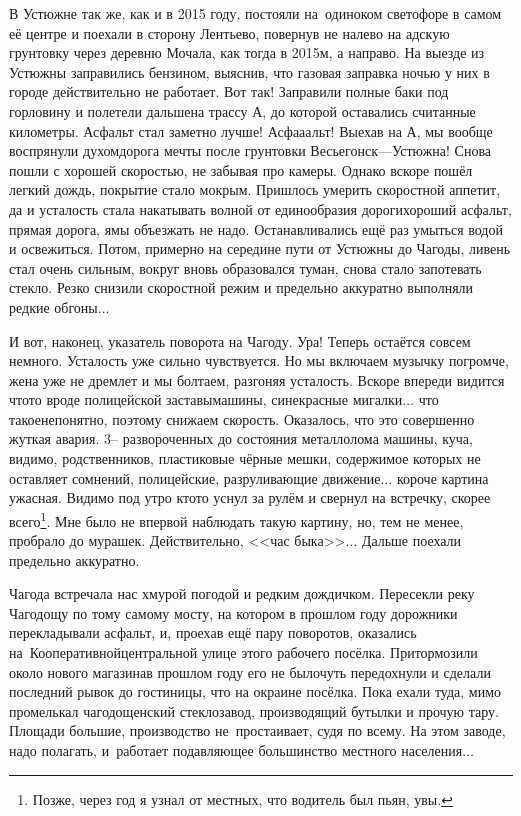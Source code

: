 В Устюжне так же, как и в 2015 году, постояли на~одиноком светофоре в самом её центре и поехали в сторону Лентьево, повернув не налево на адскую грунтовку через деревню Мочала, как тогда в 2015\sdash м, а направо. На выезде из Устюжны заправились бензином, выяснив, что газовая заправка ночью у них в городе действительно не работает. Вот так! Заправили полные баки под горловину и полетели дальше\mdash на трассу А, до которой оставались считанные километры. Асфальт стал заметно лучше! Асфа\sdash а\sdash альт! Выехав на А, мы вообще воспрянули духом\mdash дорога мечты после грунтовки Весьегонск\thinspace\nobreakdash---\thinspace Устюжна! Снова пошли с хорошей скоростью, не забывая про камеры. Однако вскоре пошёл легкий дождь, покрытие стало мокрым. Пришлось умерить скоростной аппетит, да и усталость стала накатывать волной от единообразия дороги\mdash хороший асфальт, прямая дорога, ямы объезжать не надо. Останавливались ещё раз умыться водой и освежиться. Потом, примерно на середине пути от Устюжны до Чагоды, ливень стал очень сильным, вокруг вновь образовался туман, снова стало запотевать стекло. Резко снизили скоростной режим и предельно аккуратно выполняли редкие обгоны$\ldots$

И вот, наконец, указатель поворота на Чагоду. Ура! Теперь остаётся совсем немного. Усталость уже сильно чувствуется. Но мы включаем музычку погромче, жена уже не дремлет и мы болтаем, разгоняя усталость. Вскоре впереди видится что\sdash то вроде полицейской заставы\mdash машины, сине\sdash красные мигалки$\ldots$ что такое\mdash непонятно, поэтому снижаем скорость. Оказалось, что это совершенно жуткая авария. 3\thinspace\nobreakdash-- развороченных до состояния металлолома машины, куча, видимо, родственников, пластиковые чёрные мешки, содержимое которых не оставляет сомнений, полицейские, разруливающие движение$\ldots$ короче картина ужасная. Видимо под утро кто\sdash то уснул за рулём и свернул на встречку, скорее всего\footnote{Позже, через год я узнал от местных, что водитель был пьян, увы.}. Мне было не впервой наблюдать такую картину, но, тем не менее, пробрало до мурашек. Действительно, <<час быка>>$\ldots$ Дальше поехали предельно аккуратно.

Чагода встречала нас хмурой погодой и редким дождичком. Пересекли реку Чагодощу по тому самому мосту, на котором в прошлом году дорожники перекладывали асфальт, и, проехав ещё пару поворотов, оказались на~Кооперативной\mdash центральной улице этого рабочего посёлка. Притормозили около нового магазина\mdash в прошлом году его не было\mdash чуть передохнули и сделали последний рывок до гостиницы, что на окраине посёлка. Пока ехали туда, мимо промелькал чагодощенский стеклозавод, производящий бутылки и прочую тару. Площади большие, производство не~простаивает, судя по всему. На этом заводе, надо полагать, и~работает подавляющее большинство местного населения$\ldots$

